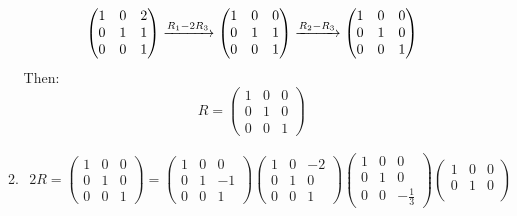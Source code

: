 \documentclass{article}
\newcommand{\ro}[1]{%
  \xrightarrow{\mathmakebox{#1}}%
}
\begin{document}
\begin{enumerate}
\begin{enumerate}[label={(\roman*)}]
\begin{alignat*}{2}
\begin{pmatrix}
          1 & 0 & 2 \\
          0 & 1 & 1 \\
          0 & 0 & 1
        \end{pmatrix}
        \ro{R_1 - 2R_3}
        \begin{pmatrix}
          1 & 0 & 0 \\
          0 & 1 & 1 \\
          0 & 0 & 1
        \end{pmatrix}
        \ro{R_2 - R_3}
        \begin{pmatrix}
          1 & 0 & 0 \\
          0 & 1 & 0 \\
          0 & 0 & 1
        \end{pmatrix}
      \end{alignat*}
      Then:
      \[
        R = 
        \begin{pmatrix}
          1 & 0 & 0 \\
          0 & 1 & 0 \\
          0 & 0 & 1
        \end{pmatrix}
      \]
    \item 
      \begin{alignat*}{2}
        R = 
        \begin{pmatrix}
          1 & 0 & 0 \\
          0 & 1 & 0 \\
          0 & 0 & 1
        \end{pmatrix}
        =
        \begin{pmatrix}
          1 & 0 & 0 \\
          0 & 1 & -1 \\
          0 & 0 & 1
        \end{pmatrix}
        \begin{pmatrix}
          1 & 0 & -2 \\
          0 & 1 & 0 \\
          0 & 0 & 1
        \end{pmatrix}
        \begin{pmatrix}
          1 & 0 & 0 \\
          0 & 1 & 0 \\
          0 & 0 & -\frac{1}{3}
        \end{pmatrix}
        \begin{pmatrix}
          1 & 0 & 0 \\
          0 & 1 & 0 \\

\end{pmatrix}
\end{alignat*}
\end{enumerate}
\end{enumerate}
\end{document}
